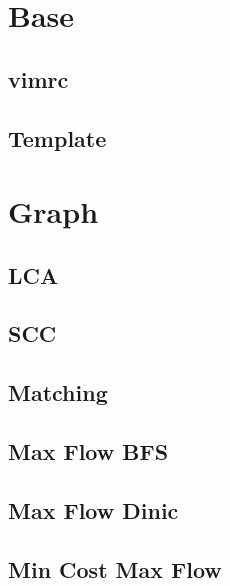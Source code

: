 \documentclass[a4paper,landscape]{article}
\begin{document}
\tableofcontents

\pagebreak

\begin{multicols}{2}

\section{Base}
\subsection{vimrc}
	
\subsection{Template}
	

\section{Graph}
\subsection{LCA}
	
\subsection{SCC}
	
\subsection{Matching}
	
\subsection{Max Flow BFS}
	
\subsection{Max Flow Dinic}
	
\subsection{Min Cost Max Flow}
	

\end{multicols}
\end{document}
